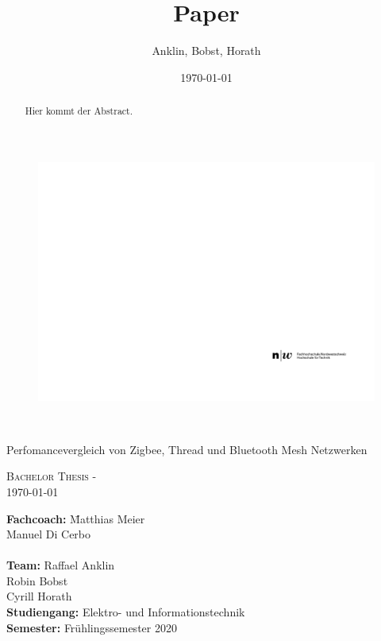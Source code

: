\documentclass[draft]{fhnwreport}       	%
\title{Paper}  		       					%
\author{Anklin, Bobst, Horath}      		%
\date{\today}          				   		%
\begin{document}
\thispagestyle{empty}
	\begin{figure}
		 \vspace*{-\topskip}\vspace*{-\headsep}
		\includegraphics[scale=1]{graphics/fhnw_ht_logo_de.pdf}
	\end{figure}
	\begin{center}
		\vspace*{2cm}
		{\huge{\textbf{\thetitle}}}\\
		\vspace*{1cm}
		
		{\huge{Perfomancevergleich von Zigbee, Thread und Bluetooth Mesh Netzwerken}}\\
		\vspace*{0.5cm}
		
		{\scshape\Large Bachelor Thesis - \theauthor \\} \Large{\today}
		\vspace*{1cm}
		
		\begin{normalsize}
			{\begin{tabbing}	
					\textbf{Fachcoach:} \hspace{6cm}\= Matthias Meier\\
					\>Manuel Di Cerbo\\
					\\[0.2cm]
					\textbf{Team:} \>Raffael Anklin \\ \>Robin Bobst \\ \>Cyrill Horath
					\\[0.2cm]
					\textbf{Studiengang:} \>Elektro- und Informationstechnik
					\\[0.2cm]	\textbf{Semester:} \>Frühlingssemester 2020
					\\[0.6cm]
			\end{tabbing}}
		
		\end{normalsize}
		\begin{abstract}
			Hier kommt der Abstract.
		\end{abstract}
		\vfill
	\end{center}
\clearpage
\end{document}
